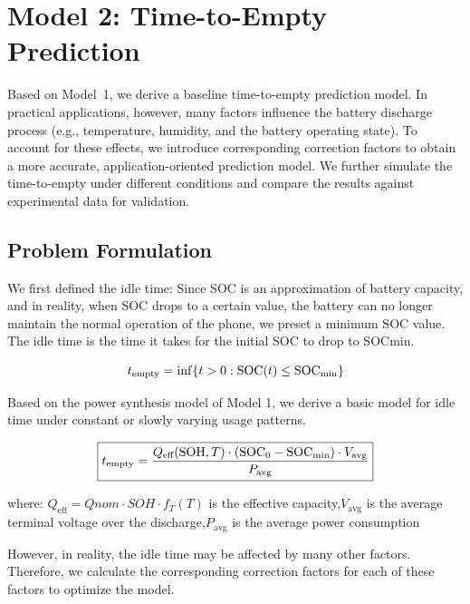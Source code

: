 \section{Model 2: Time-to-Empty Prediction}
\label{sec:model2}

\hspace*{\parindent}Based on Model~1, we derive a baseline time-to-empty prediction model. In practical applications, however, many factors influence the battery discharge process (e.g., temperature, humidity, and the battery operating state). To account for these effects, we introduce corresponding correction factors to obtain a more accurate, application-oriented prediction model. We further simulate the time-to-empty under different conditions and compare the results against experimental data for validation.

\subsection{Problem Formulation}
\label{subsec:tte_problem}

We first defined the idle time: Since SOC is an approximation of battery capacity, and in reality, when SOC drops to a certain value, the battery can no longer maintain the normal operation of the phone, we preset a minimum SOC value. The idle time is the time it takes for the initial SOC to drop to SOCmin.

\begin{equation}
    t_{\text{empty}} = \inf\{t > 0 : \text{SOC}(t) \leq \text{SOC}_{\min}\}
    \label{eq:tte_def}
\end{equation}

Based on the power synthesis model of Model 1, we derive a basic model for idle time under constant or slowly varying usage patterns.


\begin{equation}
    \boxed{t_{\text{empty}} = \frac{Q_{\text{eff}}(\text{SOH}, T) \cdot (\text{SOC}_0 - \text{SOC}_{\min}) \cdot V_{\text{avg}}}{P_{\text{avg}}}}
    \label{eq:tte_estimate}
\end{equation}

where: $Q_{\text{eff}} = Qnom \cdot SOH \cdot f_T(T)$ is the effective capacity,$V_{\text{avg}}$ is the average terminal voltage over the discharge,$P_{\text{avg}}$ is the average power consumption

However, in reality, the idle time may be affected by many other factors. Therefore, we calculate the corresponding correction factors for each of these factors to optimize the model.

